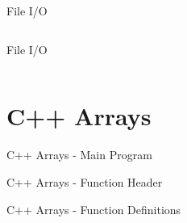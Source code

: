 \documentclass[10pt]{beamer}
\begin{document}
\begin{frame}{File I/O}
\begin{columns}[c]
  \begin{column}{0.5\textwidth}
    
  \end{column}
  \begin{column}{0.5\textwidth}
    
  \end{column}
\end{columns}
\end{frame}

\begin{frame}{File I/O}
\begin{columns}[c]
  \begin{column}{0.5\textwidth}
    
  \end{column}
  \begin{column}{0.5\textwidth}
    
  \end{column}
\end{columns}
\end{frame}

\section{C++ Arrays}

\begin{frame}[allowframebreaks]{C++ Arrays - Main Program}
 
\end{frame}

\begin{frame}[allowframebreaks]{C++ Arrays - Function Header}
 
\end{frame}

\begin{frame}[allowframebreaks]{C++ Arrays - Function Definitions}
 
\end{frame}
\end{document}
